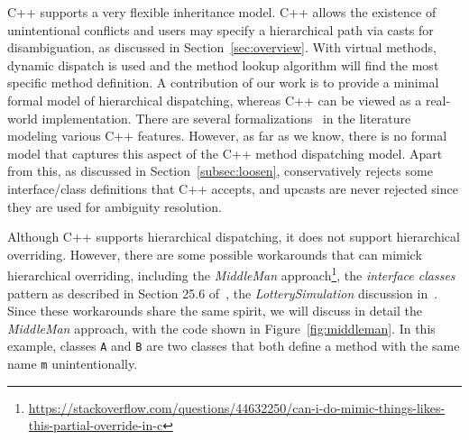 C++ supports a very flexible inheritance model.
C++ allows the existence of unintentional conflicts and users may specify a hierarchical path via casts for disambiguation, as discussed in Section~\ref{sec:overview}. 
With virtual methods, dynamic dispatch is used and the 
method lookup algorithm will find the most specific method definition. 
A contribution of our work is to provide a minimal formal model of
hierarchical dispatching, whereas C++ can be viewed as a real-world
implementation. There are several
formalizations~\cite{Wasserrab2006,ramananandro2012mechanized,Ramalingam1997}
in the literature modeling various C++ features. However, as far as we know, there is no formal model that
captures this aspect of the C++ method dispatching model. Apart from this, as discussed in Section~\ref{subsec:loosen}, \name{} conservatively rejects some interface/class definitions that C++ accepts, and upcasts are never rejected since they are used for ambiguity resolution.

Although C++ supports hierarchical dispatching, it does not support
hierarchical overriding.  However, there are some possible
workarounds that can mimick hierarchical
overriding, including the \emph{MiddleMan} approach\footnote{\url{https://stackoverflow.com/questions/44632250/can-i-do-mimic-things-likes-this-partial-override-in-c}}, the \emph{interface classes} pattern as described in Section 25.6 of~\cite{stroustrup1995}, the \emph{LotterySimulation} discussion in~\cite{stroustrup1994design}. Since these workarounds share the same spirit, we will discuss in detail the \emph{MiddleMan} approach, with the code shown in 
Figure~\ref{fig:middleman}. In this example, classes \texttt{A} and
\texttt{B} are two classes that both define a method with the same
name \texttt{m}
unintentionally.

